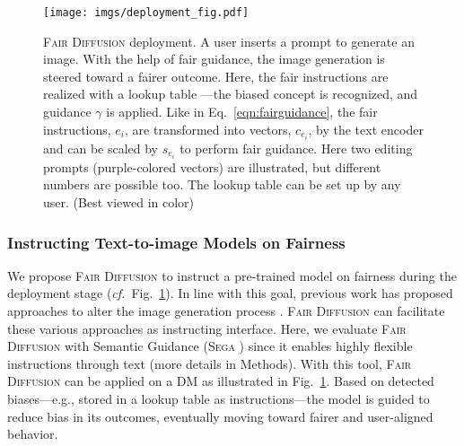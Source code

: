 \documentclass{article}%
\newcommand{\cf}{\emph{cf.}~}
\begin{document}
\begin{figure}[t]
    \centering
    \texttt{[image: imgs/deployment\_fig.pdf]}
    \caption{\textsc{Fair Diffusion} deployment. A user inserts a prompt to generate an image. With the help of fair guidance, the image generation is steered toward a fairer outcome. Here, the fair instructions are realized with a lookup table ---the biased concept is recognized, and guidance $\gamma$ is applied. 
    Like in Eq.~\ref{eqn:fairguidance}, the fair instructions, $e_i$, are transformed into vectors, $c_{e_i}$, by the text encoder and can be scaled by $s_{e_i}$ to perform fair guidance. Here two editing prompts (purple-colored vectors) are illustrated, but different numbers are possible too. The lookup table can be set up by any user. (Best viewed in color)}
    \label{fig:deployment}
\end{figure}

\subsubsection*{Instructing Text-to-image Models on Fairness}
\label{sec:instruction}
We propose \textsc{Fair Diffusion} to instruct a pre-trained model on fairness during the deployment stage (\cf Fig.~\ref{fig:deployment}).
In line with this goal, previous work has proposed approaches to alter the image generation process  \cite{hertz2022prompt,liu2022Compositional,brack2023Sega}. \textsc{Fair Diffusion} can facilitate these various approaches as instructing interface. Here, we evaluate \textsc{Fair Diffusion} with Semantic Guidance (\textsc{Sega} \cite{brack2023Sega}) since it enables highly flexible instructions through text (more details in Methods).
With this tool, \textsc{Fair Diffusion} can be applied on a DM as illustrated in Fig.~\ref{fig:deployment}. Based on detected biases---e.g., stored in a lookup table as instructions---the model is guided to reduce bias in its outcomes, eventually moving toward fairer and user-aligned behavior.
\end{document}
